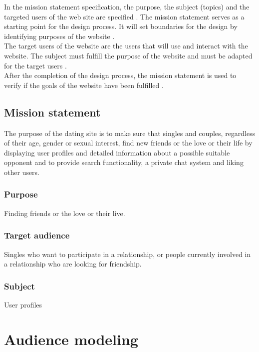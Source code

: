 \documentclass[11pt, a4paper,svglistings,oneside]{book}
\begin{document}
In the mission statement specification, the purpose, the subject (topics) and the targeted users of the web site are specified \citep{WSDM1}. The mission statement serves as a starting point for the design process. It will set boundaries for the design by identifying purposes of the website \citep{WSDM2, WSDM3}. \\
The target users of the website are the users that will use and interact with the website. The subject must fulfill the purpose of the website and must be adapted for the target users \citep{WSDM2}. \\
After the completion of the design process, the mission statement is used to verify if the goals of the website have been fulfilled \citep{WSDM3}.

\section{Mission statement}

The purpose of the dating site is to make sure that singles and couples, regardless of their age, gender or sexual interest, find new friends or the love or their life by displaying user profiles and detailed information about a possible suitable opponent and to provide search functionality, a private chat system and liking other users.

\subsection{Purpose}

Finding friends or the love or their live.

\subsection{Target audience}

Singles who want to participate in a relationship, or people currently involved in a relationship who are looking for friendship.

\subsection{Subject}

User profiles

\chapter{Audience modeling}
\end{document}
